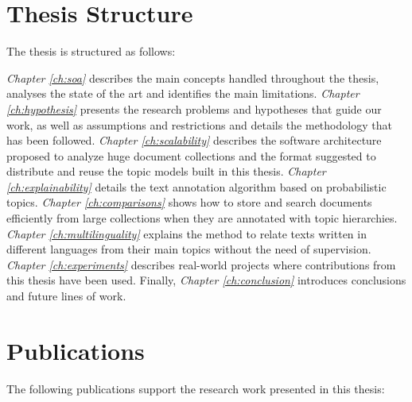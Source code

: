 \section{Thesis Structure}

The thesis is structured as follows:

\textit{Chapter \ref{ch:soa}} describes the main concepts handled throughout the thesis, analyses the state of the art and identifies the main limitations. \textit{Chapter \ref{ch:hypothesis}} presents the research problems and hypotheses that guide our work, as well as assumptions and restrictions and details the methodology that has been followed. \textit{Chapter \ref{ch:scalability}} describes the software architecture proposed to analyze huge document collections and the format suggested to distribute and reuse the topic models built in this thesis. \textit{Chapter \ref{ch:explainability}} details the text annotation algorithm based on probabilistic topics. \textit{Chapter \ref{ch:comparisons}} shows how to store and search documents efficiently from large collections when they are annotated with topic hierarchies.  \textit{Chapter \ref{ch:multilinguality}} explains the method to relate texts written in different languages from their main topics without the need of supervision. \textit{Chapter \ref{ch:experiments}} describes real-world projects where contributions from this thesis have been used. Finally, \textit{Chapter \ref{ch:conclusion}} introduces conclusions and future lines of work.


\section{Publications}

The following publications support the research work presented in this thesis:


